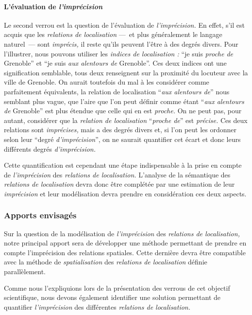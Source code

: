\paragraph{L'évaluation de \emph{l'imprécision}}

Le second verrou est la question de l'évaluation de
\emph{l'imprécision.} En effet, s'il est acquis que les
\emph{relations de localisation} ---~et plus généralement le langage
naturel~--- sont \emph{imprécis,} il reste qu'ils peuvent l'être à des
degrés divers. Pour l'illustrer, nous pouvons utiliser les
\emph{indices de localisation :} \enquote{je suis \emph{proche de}
  Grenoble} et \enquote{je suis \emph{aux alentours de} Grenoble}. Ces
deux indices ont une signification semblable, tous deux renseignent
sur la proximité du locuteur avec la ville de Grenoble. On aurait
toutefois du mal à les considérer comme parfaitement équivalents, la
relation de localisation \enquote{\emph{aux alentours de}} nous
semblant plus vague, \ie que l'aire que l'on peut définir comme étant
\enquote{\emph{aux alentours de} Grenoble} est plus étendue que celle
qui en est \emph{proche.} On ne peut pas, pour autant, considérer que
la \emph{relation de localisation} \enquote{\emph{proche de}} est
\emph{précise.} Ces deux relations sont \emph{imprécises,} mais a des
degrés divers et, si l'on peut les ordonner selon leur \enquote{degré
  \emph{d'imprécision}}, on ne saurait quantifier cet écart et donc
leurs différents degrés \emph{d'imprécision.}

Cette quantification est cependant une étape indispensable à la prise
en compte de \emph{l'imprécision} des \emph{relations de
  localisation.} L'analyse de la sémantique des \emph{relations de
  localisation} devra donc être complétée par une estimation de leur
\emph{imprécision} et leur modélisation devra prendre en considération
ces deux aspects.

\subsubsection{Apports envisagés}

Sur la question de la modélisation de \emph{l'imprécision} des
\emph{relations de localisation,} notre principal apport sera de
développer une méthode permettant de prendre en compte l'imprécision
des relations spatiales. Cette dernière devra être compatible avec la
méthode de \emph{spatialisation} des \emph{relations de localisation}
définie parallèlement.

Comme nous l'expliquions lors de la présentation des verrous de cet
objectif scientifique, nous devons également identifier une solution
permettant de quantifier \emph{l'imprécision} des différentes
\emph{relations de localisation.}

